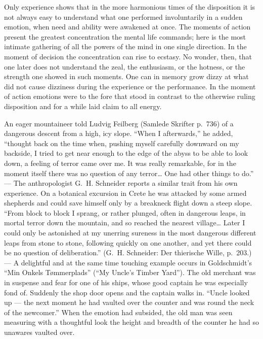\documentclass[12pt]{book}
\newcommand{\opage}[1]{\marginnote{\footnotesize\textit{[#1]}}}
\begin{document}
Only experience shows that in the more harmonious times of the disposition it is not always
easy to understand what one performed involuntarily in a sudden emotion, when need and
ability were awakened at once. The moments of action present the greatest concentration the
mental life commands; here is the most intimate gathering of all the powers of the mind in
one single direction. In the moment of decision the concentration can rise to ecstasy. No
wonder, then, that one later does not understand the zeal, the enthusiasm, or the hotness,
or the strength one showed in such moments. One can in memory grow dizzy at what did not
cause dizziness during the experience or the performance. In the moment of action emotions
were to the fore that stood in contrast to the otherwise ruling disposition and for a while
laid claim to all energy.

An eager mountaineer told Ludvig Feilberg (Samlede Skrifter p.~736) of a dangerous descent
from a high, icy slope. ``When I afterwards,'' he added, ``thought back on the time when,
pushing myself carefully downward on my backside, I tried to get near enough to the edge of
the abyss to be able to look down, a feeling of terror came over me. It was really
remarkable, for in the moment itself there was no question of any terror\dots{} One had
other things to do.'' --- The anthropologist G.~H. Schneider reports a similar trait from
his own experience. On a botanical excursion in Crete he was attacked by some armed shepherds
and could save himself only by a breakneck flight down a steep slope. ``From block to block
I sprang, or rather plunged, often in dangerous leaps, in mortal terror down the mountain,
and so reached the nearest village\dots{} Later I could only be astonished at my unerring
sureness in the most dangerous different leaps from stone to stone, following quickly on one
another, and yet there \opage{131}could be no question of deliberation.'' (G.~H. Schneider:
Der thierische Wille, p.~203.) --- A delightful and at the same time touching example occurs
in Goldschmidt's ``Min Onkels Tømmerplads'' (``My Uncle's Timber Yard''). The old merchant
was in suspense and fear for one of his ships, whose good captain he was especially fond of.
Suddenly the shop door opens and the captain walks in. ``Uncle looked up --- the next moment
he had vaulted over the counter and was round the neck of the newcomer.'' When the emotion had
subsided, the old man was seen measuring with a thoughtful look the height and breadth of the
counter he had so unawares vaulted over.
\end{document}
